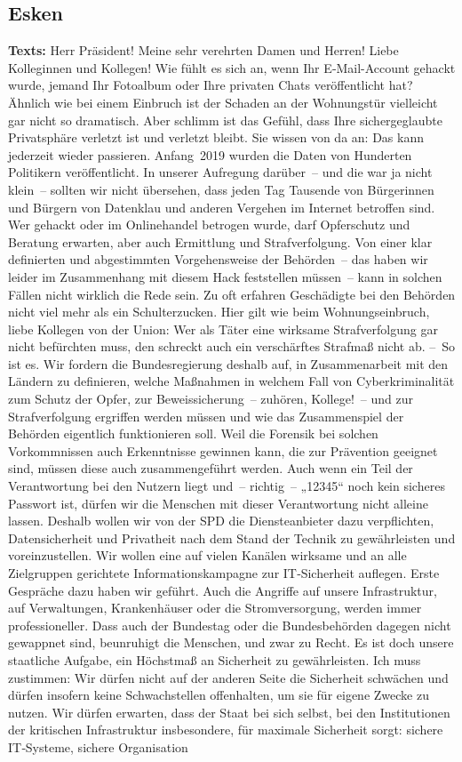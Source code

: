 \documentclass{article}
\begin{document}
\subsection{Esken}
\noindent\textbf{Texts:} Herr Präsident! Meine sehr verehrten Damen und Herren! Liebe Kolleginnen und Kollegen! Wie fühlt es sich an, wenn Ihr E‑Mail-Account gehackt wurde, jemand Ihr Fotoalbum oder Ihre privaten Chats veröffentlicht hat? Ähnlich wie bei einem Einbruch ist der Schaden an der Wohnungstür vielleicht gar nicht so dramatisch. Aber schlimm ist das Gefühl, dass Ihre sichergeglaubte Privatsphäre verletzt ist und verletzt bleibt. Sie wissen von da an: Das kann jederzeit wieder passieren. Anfang 2019 wurden die Daten von Hunderten Politikern veröffentlicht. In unserer Aufregung darüber – und die war ja nicht klein – sollten wir nicht übersehen, dass jeden Tag Tausende von Bürgerinnen und Bürgern von Datenklau und anderen Vergehen im Internet betroffen sind. Wer gehackt oder im Onlinehandel betrogen wurde, darf Opferschutz und Beratung erwarten, aber auch Ermittlung und Strafverfolgung. Von einer klar definierten und abgestimmten Vorgehensweise der Behörden – das haben wir leider im Zusammenhang mit diesem Hack feststellen müssen – kann in solchen Fällen nicht wirklich die Rede sein. Zu oft erfahren Geschädigte bei den Behörden nicht viel mehr als ein Schulterzucken. Hier gilt wie beim Wohnungseinbruch, liebe Kollegen von der Union: Wer als Täter eine wirksame Strafverfolgung gar nicht befürchten muss, den schreckt auch ein verschärftes Strafmaß nicht ab.  – So ist es. Wir fordern die Bundesregierung deshalb auf, in Zusammenarbeit mit den Ländern zu definieren, welche Maßnahmen in welchem Fall von Cyberkriminalität zum Schutz der Opfer, zur Beweissicherung – zuhören, Kollege! – und zur Strafverfolgung ergriffen werden müssen und wie das Zusammenspiel der Behörden eigentlich funktionieren soll. Weil die Forensik bei solchen Vorkommnissen auch Erkenntnisse gewinnen kann, die zur Prävention geeignet sind, müssen diese auch zusammengeführt werden. Auch wenn ein Teil der Verantwortung bei den Nutzern liegt und – richtig – „12345“ noch kein sicheres Passwort ist, dürfen wir die Menschen mit dieser Verantwortung nicht alleine lassen. Deshalb wollen wir von der SPD die Diensteanbieter dazu verpflichten, Datensicherheit und Privatheit nach dem Stand der Technik zu gewährleisten und voreinzustellen. Wir wollen eine auf vielen Kanälen wirksame und an alle Zielgruppen gerichtete Informationskampagne zur IT‑Sicherheit auflegen. Erste Gespräche dazu haben wir geführt. Auch die Angriffe auf unsere Infrastruktur, auf Verwaltungen, Krankenhäuser oder die Stromversorgung, werden immer professioneller. Dass auch der Bundestag oder die Bundesbehörden dagegen nicht gewappnet sind, beunruhigt die Menschen, und zwar zu Recht. Es ist doch unsere staatliche Aufgabe, ein Höchstmaß an Sicherheit zu gewährleisten. Ich muss zustimmen: Wir dürfen nicht auf der anderen Seite die Sicherheit schwächen und dürfen insofern keine Schwachstellen offenhalten, um sie für eigene Zwecke zu nutzen.  Wir dürfen erwarten, dass der Staat bei sich selbst, bei den Institutionen der kritischen Infrastruktur insbesondere, für maximale Sicherheit sorgt: sichere IT‑Systeme, sichere Organisation 
\end{document}
